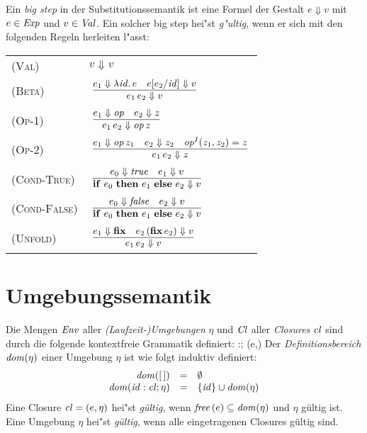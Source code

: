 \documentclass[12pt,fleqn,a4paper]{article}
\newcommand{\RN}[1]{\mbox{\textsc{(#1)}}}
\newcommand{\Cl}{\name{Cl}}
\newcommand{\cl}{\name{cl}}
\begin{document}
\begin{definition}
Ein {\em big step} in der Substitutionssemantik ist eine Formel der Gestalt $e \Downarrow v$ mit $e\in{\text{\it Exp\/}}$
und $v \in {\text{\it Val\/}}$. Ein solcher big step hei"st {\em g"ultig}, wenn er sich mit den folgenden Regeln herleiten
l"asst: \\[5mm]
\begin{tabular}{ll}
  \RN{Val}        & $v \Downarrow v$ \\[3mm]
  \RN{Beta}       & $\regel{e_1 \Downarrow \abstr{\id}{e} \quad e[e_2/\id] \Downarrow v}
                           {\app{e_1}{e_2} \Downarrow v}$ \\[3mm]
  \RN{Op-1}       & $\regel{e_1 \Downarrow \op \quad e_2 \Downarrow z}
                           {\app{e_1}{e_2} \Downarrow \app{\op}{z}}$ \\[3mm]
  \RN{Op-2}       & $\regel{e_1 \Downarrow \app{\op}{z_1} \quad e_2 \Downarrow z_2 \quad \op^I(z_1,z_2) = z}
                           {\app{e_1}{e_2} \Downarrow z}$ \\[3mm]
  \RN{Cond-True}  & $\regel{e_0 \Downarrow \true \quad e_1 \Downarrow v}
                           {\bifte{e_0}{e_1}{e_2} \Downarrow v}$ \\[3mm]
  \RN{Cond-False} & $\regel{e_0 \Downarrow \false \quad e_2 \Downarrow v}
                           {\bifte{e_0}{e_1}{e_2} \Downarrow v}$ \\[3mm]
  \RN{Unfold}     & $\regel{e_1 \Downarrow \bfix \quad \app{e_2}{(\app{\bfix}{e_2})} \Downarrow v}
                           {\app{e_1}{e_2} \Downarrow v}$
\end{tabular}
\end{definition}


\section{Umgebungssemantik}

\begin{definition}
  Die Mengen ${\text{\it Env\/}}$ aller {\em (Laufzeit-)Umgebungen} $\eta$ und $\Cl$ aller {\em Closures} $\cl$ sind
  durch die folgende kontextfreie Grammatik definiert:
  \bgram
  \eta \is [\,] \mid \id:\cl;\eta \n
  \cl \is (e,\eta)
  \egram
  Der {\em Definitionsbereich} ${\text{\it dom\/}}(\eta)$ einer Umgebung $\eta$ ist wie folgt induktiv definiert:
  \[\begin{array}{rcl}
    \dom{[\,]} &=& \emptyset \\
    \dom{\id:\cl;\eta} &=& \{\id\} \cup \dom{\eta}
  \end{array}\]
  Eine Closure $\cl = (e,\eta)$ hei"st {\em g\"ultig}, wenn ${\text{\it free\/}}\,(e) \subseteq {\text{\it dom\/}}(\eta)$ und
  $\eta$ g\"ultig ist. Eine Umgebung $\eta$ hei"st {\em g\"ultig}, wenn alle eingetragenen
  Closures g\"ultig sind.
\end{definition}
\end{document}

